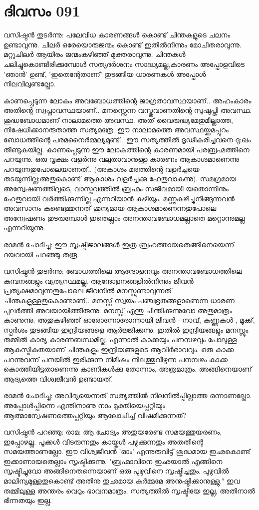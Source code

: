 \newpage
\section{ദിവസം 091}


വസിഷ്ഠന്‍ തുടര്‍ന്നു: പലേവിധ കാരണങ്ങള്‍ കൊണ്ട്‌ ചിന്തകളുടെ ചലനം ഉണ്ടാവുന്നു. ചിലര്‍ ഒരേയൊരുജന്മം കൊണ്ട്‌ ഇതില്‍നിന്നും മോചിതരാവുന്നു. മറ്റുചിലര്‍ ആയിരം ജന്മംകഴിഞ്ഞ്‌ മുക്തരാവുന്നു. ചിന്തകള്‍ ചലിച്ചുകൊണ്ടിരിക്കുമ്പോള്‍ സത്യദര്‍ശനം സാദ്ധ്യമല്ല,കാരണം അപ്പോളവിടെ 'ഞാന്‍' ഉണ്ട്‌, 'ഇതെന്റേതാണ്‌' തുടങ്ങിയ ധാരണകള്‍ അപ്പോള്‍  നിലവിലുണ്ടല്ലോ. 

കാണപ്പെടുന്ന ലോകം അവബോധത്തിന്റെ ജാഗ്രതാവസ്ഥയാണ്‌.. അഹംകാരം അതിന്റെ സ്വപ്നാവസ്ഥയാണ്‌.. മനസ്സെന്ന വസ്തുവാണതിന്റെ സുഷുപ്തി അവസ്ഥ. ശുദ്ധബോധമാണ്‌ നാലാമത്തെ അവസ്ഥ. അത്‌ വൈരുദ്ധ്യമേതുമില്ലാത്ത, നിഷേധിക്കാനരുതാത്ത സത്യമത്രേ. ഈ നാലാമത്തെ അവസ്ഥയ്ക്കുമപ്പുറം ബോധത്തിന്റെ പരമനൈര്‍മ്മല്യമുണ്ട്‌.. ഈ സത്യത്തില്‍ ദൃഢീകരിച്ചവനെ ദു:ഖം തീണ്ടുകയില്ല. കാണപ്പെടുന്ന ഈ ലോകത്തിന്റെ കാരണമായി പരബ്രഹ്മത്തിനെ പറയുന്നു. ഒരു വൃക്ഷം വളര്‍ന്നു വലുതാവാനുള്ള കാരണം ആകാശമാണെന്നു പറയുന്നതുപോലെയാണത്‌.. (അകാശം മരത്തിന്റെ വളര്‍ച്ചയെ തടയുന്നില്ല;അതുകൊണ്ട്‌ ആകാശം വളര്‍ച്ചക്കു ഹേതുവാകുന്നു). സമഗ്രമായ അന്വേഷണത്തിലൂടെ, വാസ്തവത്തില്‍ ബ്രഹ്മം സജീവമായി യതൊന്നിനും ഹേതുവായി വര്‍ത്തിക്കുന്നില്ല എന്നറിയാന്‍ കഴിയും. മണ്ണുകുഴിച്ചുനീങ്ങുന്നവന്‍ അവസാനം കണ്ടെത്തുന്നത്‌ ശൂന്യമായ ആകാശമാണെന്നതുപോലെ അന്വേഷണം തുടരുമ്പോള്‍ ഇതെല്ലാം അനന്താവബോധമല്ലാതെ മറ്റൊന്നുമല്ല എന്നറിയുന്നു. 

രാമന്‍ ചോദിച്ചു: ഈ സൃഷ്ടിജാലങ്ങള്‍ ഇത്ര ബ്രഹത്തായതെങ്ങിനെയെന്ന് ദയവായി പറഞ്ഞു തരൂ. 

വസിഷ്ഠന്‍ തുടര്‍ന്നു: ബോധത്തിലെ ആന്ദോളനവും അനന്താവബോധത്തിലെ കമ്പനങ്ങളും വ്യത്യസ്ഥമല്ല. ആന്ദോളനങ്ങളില്‍നിന്നും ജീവന്‍ പ്രത്യക്ഷമാവുന്നതുപോലെ ജീവനില്‍ മനസ്സുണ്ടാവുന്നത്‌ ചിന്തകളുള്ളതുകൊണ്ടാണ്‌.. മനസ്സ്‌ സ്വയം പഞ്ചഭൂതങ്ങളാണെന്ന  ധാരണ പുലര്‍ത്തി അവയായിത്തീരുന്നു. മനസ്സ്‌ എന്തു ചിന്തിക്കുന്നുവോ അതുമാത്രം കാണുന്നു. അതുകഴിഞ്ഞ്‌ ഓരോന്നോരോന്നായി ജീവന്‍ - നാവ്‌, കണ്ണുകള്‍ , മൂക്ക്‌, സ്പര്‍ശം തുടങ്ങിയ ഇന്ദ്രിയങ്ങളെ ആര്‍ജ്ജിക്കുന്നു. ഇതില്‍ ഇന്ദ്രിയങ്ങളും മനസ്സും തമ്മില്‍ കാര്യ കാരണബന്ധമില്ല. എന്നാല്‍ കാക്കയും പനമ്പഴവും പോലുള്ള ആകസ്മികതയാണ്‌ ചിന്തകളും ഇന്ദ്രിയങ്ങളുടെ ആവിര്‍ഭാവവും. ഒരു കാക്ക പറന്നുവന്ന് പനയില്‍ ഇരിക്കുന്ന നിമിഷം നിലത്തുവീഴുന്ന പനമ്പഴം കാക്ക കൊത്തിയിട്ടതാണെന്നു കാണികള്‍ക്കു തോന്നാം, അത്രമാത്രം. അങ്ങിനെയാണ്‌ ആദ്യത്തെ വിശ്വജീവന്‍ ഉണ്ടായത്‌.

രാമന്‍ ചോദിച്ചു: അവിദ്യയെന്നത്‌ സത്യത്തില്‍ നിലനില്‍പ്പില്ലാത്ത ഒന്നാണല്ലോ. അപ്പോള്‍പ്പിന്നെ എന്തിനാണു നാം മുക്തിയെപ്പറ്റിയും ആത്മാന്വേഷണത്തെപ്പറ്റിയും ആലോചിച്ച്  വിഷമിക്കുന്നത്‌? 

വസിഷ്ഠന്‍ പറഞ്ഞു: രാമ: ആ ചോദ്യം അതുയരേണ്ട സമയത്തുയരണം, ഇപ്പോഴല്ല. പൂക്കള്‍ വിടരുന്നതും കായ്കള്‍ പഴുക്കുന്നതും അതതിന്റെ സമയത്താണല്ലോ. ഈ വിശ്വജീവന്‍ 'ഓം' എന്നുരുവിട്ട്‌ ശുദ്ധമായ ഇഛകൊണ്ട്‌ ഇക്കാണായതെല്ലാം സൃഷ്ടിക്കുന്നു. "ബ്രഹ്മാവിനെ ഇഛയാല്‍ എങ്ങിനെ സൃഷ്ടിച്ചുവോ അങ്ങിനെതന്നെയാണ്‌ ഒരു പുഴുവിനെ സൃഷ്ടിച്ചതും. പുഴുവില്‍ മാലിന്യമുള്ളതുകൊണ്ട്‌ അതിനു തുഛമായ കര്‍മ്മമേ അനുഷ്ഠിക്കാനുള്ളു." ഇവ തമ്മിലുള്ള അന്തരം വെറും ഭാവനമാത്രം. സത്യത്തില്‍ സൃഷ്ടിയേ ഇല്ല, അതിനാല്‍ ഭിന്നതയും ഇല്ല. 
